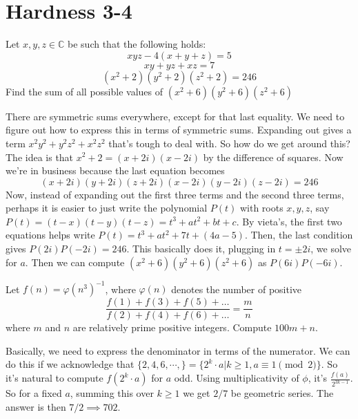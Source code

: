 \documentclass[11pt]{scrartcl}
\begin{document}
\section{Hardness 3-4}
\begin{example}
  Let $x,y,z\in\mathbb{C}$ be such that the following holds:
  $$xyz-4(x+y+z)=5$$
  $$xy+yz+xz=7$$
  $$(x^2+2)(y^2+2)(z^2+2)=246$$
  Find the sum of all possible values of $(x^2+6)(y^2+6)(z^2+6)$
\end{example}
\begin{soln}
  There are symmetric sums everywhere, except for that last equality. We need to figure out how to express this in terms
  of symmetric sums. Expanding out gives a term $x^2y^2+y^2z^2+x^2z^2$ that's tough to deal with. So how do we get around this?
  The idea is that $x^2+2=(x+2i)(x-2i)$ by the difference of squares. Now we're in business because the last equation becomes
  $$(x+2i)(y+2i)(z+2i)(x-2i)(y-2i)(z-2i)=246$$
  Now, instead of expanding out the first three terms and the second three terms, perhaps it is easier to just write the
  polynomial $P(t)$ with roots $x,y,z$, say $P(t)=(t-x)(t-y)(t-z)=t^3+at^2+bt+c$. By vieta's, the first two equations helps
  write $P(t)=t^3+at^2+7t+(4a-5)$. Then, the last condition gives $P(2i)P(-2i)=246$. This basically does it,
  plugging in $t=\pm 2i$, we solve for $a$. Then we can compute $(x^2+6)(y^2+6)(z^2+6)$ as $P(6i)P(-6i)$.
\end{soln}
\begin{example}
  Let $f(n)=\varphi(n^3)^{-1}$, where $\varphi(n)$ denotes the number of positive
\[ \frac{f(1)+f(3)+f(5)+\dots}{f(2)+f(4)+f(6)+\dots} = \frac{m}{n} \]
where $m$ and $n$ are relatively prime positive integers. Compute $100m+n$.

\end{example}
\begin{soln}
    Basically, we need to express the denominator in terms of the numerator. We can do this
  if we acknowledge that $\{2,4,6,\cdots,\}=\{2^k\cdot a|k\ge 1, a\equiv 1\pmod{2}\}$. So it's natural to compute $f(2^k\cdot a)$ for $a$ odd.
  Using multiplicativity of $\phi$, it's $\frac{f(a)}{2^{3k-1}}$. So for a fixed $a$, summing this over $k\ge 1$ we get $2/7$ be geometric series.
  The answer is then $7/2\implies 702$.

\end{soln}
\newpage
\end{document}
